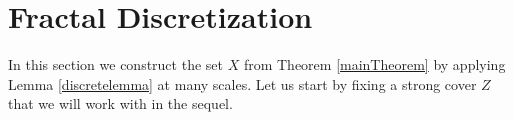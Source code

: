 \section{Fractal Discretization}\label{discretizationsection}

In this section we construct the set $X$ from Theorem \ref{mainTheorem} by applying Lemma \ref{discretelemma} at many scales. Let us start by fixing a strong cover $Z$ that we will work with in the sequel.


